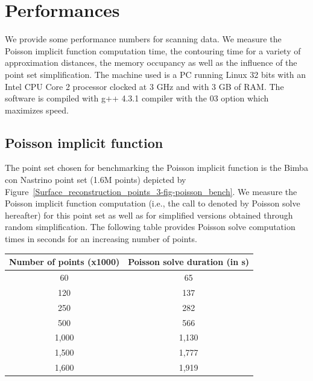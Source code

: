 \section{Performances}
\label{surface_reconstruction_section_performances}

We provide some performance numbers for scanning data. We measure the Poisson implicit function computation time, the contouring time for a variety of approximation distances, the memory occupancy as well as the influence of the point set simplification. The machine used is a PC running Linux 32 bits with an Intel CPU Core 2 processor clocked at 3 GHz and with 3 GB of RAM. The software is compiled with g++ 4.3.1 compiler with the 03 option which maximizes speed.

\subsection{Poisson implicit function}

The point set chosen for benchmarking the Poisson implicit function is the Bimba con Nastrino point set (1.6M points) depicted by Figure~\ref{Surface_reconstruction_points_3-fig-poisson_bench}. We measure the Poisson implicit function computation (i.e., the call to  denoted by Poisson solve hereafter) for this point set as well as for simplified versions obtained through random simplification. The following table provides Poisson solve computation times in seconds for an increasing number of points.

\begin{tabular}{|c|c|}
  \hline
  Number of points (x1000) & Poisson solve duration (in s) \\
  \hline
  60                         & 65 \\
  120                        & 137 \\
  250                        & 282 \\
  500                        & 566 \\
  1,000                       & 1,130 \\
  1,500                       & 1,777 \\
  1,600                       & 1,919 \\
  \hline
\end{tabular}

